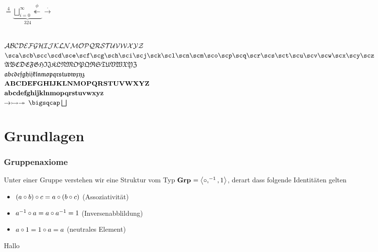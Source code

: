 \documentclass{article}
\begin{document}
$\stackrel{4}{=} \underbrace{\bigsqcup\limits_{i=0}^{\infty} \stackrel{\phi}{\twoheadleftarrow}}_{324} \stackrel{.}{\rightarrow}$ 
\\
$\scA\scB\scC\scD\scE\scF\scG\scH\scI\scJ\scK\scL\scN\scM\scO\scP\scQ\scR\scS\scT\scU\scV\scW\scX\scY\scZ$\\
$\sca\scb\scc\scd\sce\scf\scg\sch\sci\scj\sck\scl\scn\scm\sco\scp\scq\scr\scs\sct\scu\scv\scw\scx\scy\scz$\\
$\fkA\fkB\fkC\fkD\fkE\fkF\fkG\fkH\fkI\fkJ\fkK\fkL\fkN\fkM\fkO\fkP\fkQ\fkR\fkS\fkT\fkU\fkV\fkW\fkX\fkY\fkZ$\\
$\fka\fkb\fkc\fkd\fke\fkf\fkg\fkh\fki\fkj\fkk\fkl\fkn\fkm\fko\fkp\fkq\fkr\fks\fkt\fku\fkv\fkw\fkx\fky\fkz$\\
$\bfA\bfB\bfC\bfD\bfE\bfF\bfG\bfH\bfI\bfJ\bfK\bfL\bfN\bfM\bfO\bfP\bfQ\bfR\bfS\bfT\bfU\bfV\bfW\bfX\bfY\bfZ$\\
$\bfa\bfb\bfc\bfd\bfe\bff\bfg\bfh\bfi\bfj\bfk\bfl\bfn\bfm\bfo\bfp\bfq\bfr\bfs\bft\bfu\bfv\bfw\bfx\bfy\bfz$\\
$\to\into\onto$
$\catprod\catcoprod$

\part{Grundlagen}

\section{Gruppenaxiome}

Unter einer Gruppe verstehen wir eine Struktur vom Typ $\Grp=\struct{\compose,^{-1},1}$, derart dass folgende Identitäten gelten
\begin{itemize}
        \item $(a\compose b)\compose c = a\compose (b\compose c)$ (Assoziativität)
        \item $a^{-1}\compose a = a\compose a^{-1} = 1$ (Inversenabblildung)
    \item $a\compose 1 = 1\compose a = a$ (neutrales Element)
\end{itemize}

\begin{theorem}
    Hallo
\end{theorem}

\end{document}
